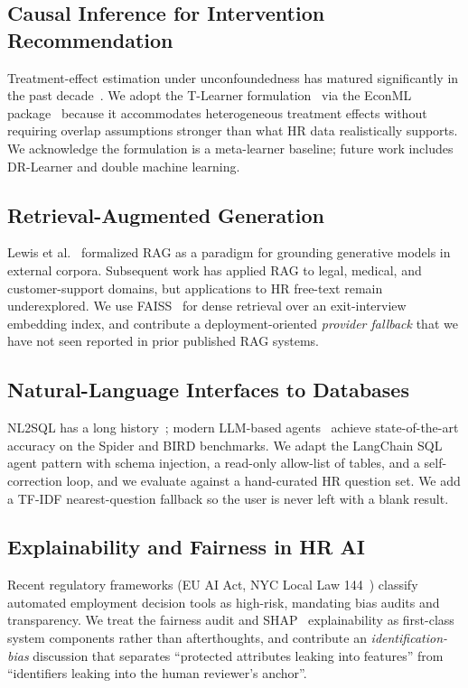 \documentclass[conference]{IEEEtran}
\begin{document}
\subsection{Causal Inference for Intervention Recommendation}
Treatment-effect estimation under unconfoundedness has matured
significantly in the past decade~\cite{wager2018, kennedy2020}. We
adopt the T-Learner formulation~\cite{kunzel2019} via the EconML
package~\cite{econml2019} because it accommodates heterogeneous
treatment effects without requiring overlap assumptions stronger
than what HR data realistically supports. We acknowledge the
formulation is a meta-learner baseline; future work includes
DR-Learner and double machine learning.

\subsection{Retrieval-Augmented Generation}
Lewis et al.~\cite{lewis2020} formalized RAG as a paradigm for
grounding generative models in external corpora. Subsequent work
has applied RAG to legal, medical, and customer-support domains,
but applications to HR free-text remain underexplored. We use
FAISS~\cite{johnson2019} for dense retrieval over an exit-interview
embedding index, and contribute a deployment-oriented \emph{provider
fallback} that we have not seen reported in prior published RAG
systems.

\subsection{Natural-Language Interfaces to Databases}
NL2SQL has a long history~\cite{androutsopoulos1995}; modern
LLM-based agents~\cite{rajkumar2022, pourreza2023} achieve
state-of-the-art accuracy on the Spider and BIRD benchmarks. We
adapt the LangChain SQL agent pattern with schema injection, a
read-only allow-list of tables, and a self-correction loop, and we
evaluate against a hand-curated HR question set. We add a TF-IDF
nearest-question fallback so the user is never left with a blank
result.

\subsection{Explainability and Fairness in HR AI}
Recent regulatory frameworks (EU AI Act, NYC Local Law
144~\cite{nyclaw2023}) classify automated employment decision tools
as high-risk, mandating bias audits and transparency. We treat the
fairness audit and SHAP~\cite{lundberg2017} explainability as
first-class system components rather than afterthoughts, and
contribute an \emph{identification-bias} discussion that separates
``protected attributes leaking into features'' from ``identifiers
leaking into the human reviewer's anchor''.
\end{document}
